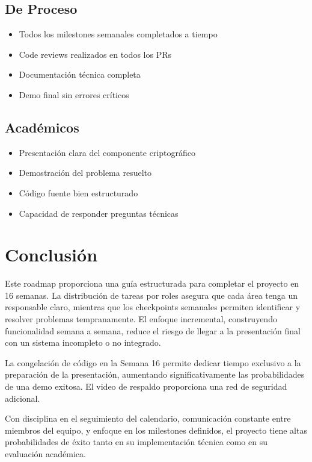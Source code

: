 \documentclass[12pt,a4paper]{article}
\begin{document}
\subsection{De Proceso}

\begin{itemize}[leftmargin=*]
    \item Todos los milestones semanales completados a tiempo
    \item Code reviews realizados en todos los PRs
    \item Documentación técnica completa
    \item Demo final sin errores críticos
\end{itemize}

\subsection{Académicos}

\begin{itemize}[leftmargin=*]
    \item Presentación clara del componente criptográfico
    \item Demostración del problema resuelto
    \item Código fuente bien estructurado
    \item Capacidad de responder preguntas técnicas
\end{itemize}

\section{Conclusión}

Este roadmap proporciona una guía estructurada para completar el proyecto en 16 semanas. La distribución de tareas por roles asegura que cada área tenga un responsable claro, mientras que los checkpoints semanales permiten identificar y resolver problemas tempranamente. El enfoque incremental, construyendo funcionalidad semana a semana, reduce el riesgo de llegar a la presentación final con un sistema incompleto o no integrado.

La congelación de código en la Semana 16 permite dedicar tiempo exclusivo a la preparación de la presentación, aumentando significativamente las probabilidades de una demo exitosa. El video de respaldo proporciona una red de seguridad adicional.

Con disciplina en el seguimiento del calendario, comunicación constante entre miembros del equipo, y enfoque en los milestones definidos, el proyecto tiene altas probabilidades de éxito tanto en su implementación técnica como en su evaluación académica.
\end{document}
